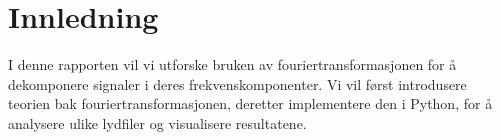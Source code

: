 \section{Innledning}
I denne rapporten vil vi utforske bruken av fouriertransformasjonen for å dekomponere signaler i deres frekvenskomponenter. Vi vil først introdusere teorien bak fouriertransformasjonen, deretter implementere den i Python, for å analysere ulike lydfiler og visualisere resultatene.